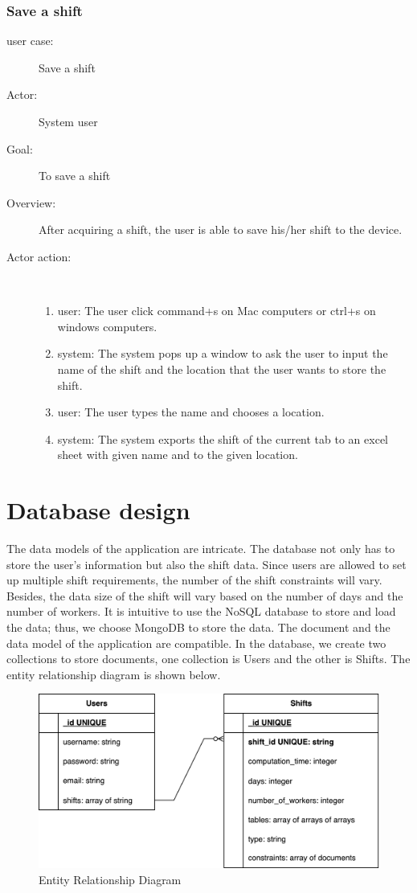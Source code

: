 \documentclass[11pt, oneside]{article}   	%
\begin{document}
\subsubsection{Save a shift}
\begin{description}
\item[user case:] Save a shift
\item[Actor:] System user
\item[Goal:] To save a shift
\item[Overview:]After acquiring a shift, the user is able to save his/her shift to the device.
\item[Actor action:]
\
\begin{enumerate}
\item user: The user click command+s on Mac computers or ctrl+s on windows computers.
\item system: The system pops up a window to ask the user to input the name of the shift and the location that the user wants to store the shift.
\item user: The user types the name and chooses a location.
\item system: The system exports the shift of the current tab to an excel sheet with given name and to the given location.
\end{enumerate}
\end{description}

\section{Database design}
The data models of the application are intricate. The database not only has to store the user’s information but also the shift data. Since users are allowed to set up multiple shift requirements, the number of the shift constraints will vary. Besides, the data size of the shift will vary based on the number of days and the number of  workers. It is intuitive to use the NoSQL database to store and load the data; thus, we choose MongoDB to store the data. The document and the data model of the application are compatible. In the database, we create two collections to store documents, one collection is Users and the other is Shifts. The entity relationship diagram is shown below.


\begin{figure}[h]
\centering
\includegraphics[width=\textwidth]{ erd }
\caption{Entity Relationship Diagram}
\label{erd}
\end{figure}
\end{document}
